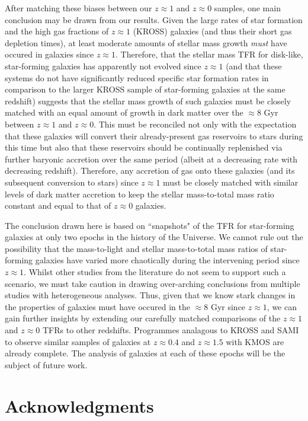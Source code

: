 \documentclass[a4paper,fleqn,usenatbib]{mnras}
\begin{document}
{After matching these biases between our $z\approx1$ and $z\approx0$ samples, one main conclusion may be drawn from our results. Given the large rates of star formation and the high gas fractions of $z\approx1$ (KROSS) galaxies (and thus their short gas depletion times), at least moderate amounts of stellar mass growth {\em must} have occured in galaxies since $z\approx1$. Therefore, that the stellar mass TFR for disk-like, star-forming galaxies has apparently not evolved since $z\approx1$ (and that these systems do not have significantly reduced specific star formation rates in comparison to the larger KROSS sample of star-forming galaxies at the same redshift) suggests that the stellar mass growth of such galaxies must be closely matched with an equal amount of growth in dark matter over the $\approx8$ Gyr between $z\approx1$ and $z\approx0$. This must be reconciled not only with the expectation that these galaxies will convert their already-present gas reservoirs to stars during this time but also that these reservoirs should be continually replenished via further baryonic accretion over the same period (albeit at a decreasing rate with decreasing redshift). Therefore, any accretion of gas onto these galaxies (and its subsequent conversion to stars) since $z\approx1$ must be closely matched with similar levels of dark matter accretion to keep the stellar mass-to-total mass ratio constant and equal to that of $z\approx0$ galaxies. 


The conclusion drawn here is based on ``snapshots" of the TFR for star-forming galaxies at only two epochs in the history of the Universe. We cannot rule out the possibility that the mass-to-light and stellar mass-to-total mass ratios of star-forming galaxies have varied more chaotically during the intervening period since $z\approx1$. Whilst other studies from the literature do not seem to support such a scenario, we must take caution in drawing over-arching conclusions from multiple studies with heterogeneous analyses. Thus, given that we know stark changes in the properties of galaxies must have occured in the $\approx8$ Gyr since $z\approx1$, we can gain further insights by extending our carefully matched comparisons of the $z\approx1$ and $z\approx0$ TFRs to other redshifts.  Programmes analagous to KROSS and SAMI to observe similar samples of galaxies at $z\approx0.4$ and $z\approx1.5$ with KMOS are already complete. The analysis of galaxies at each of these epochs will be the subject of future work.


\section*{Acknowledgments}

}
\end{document}
